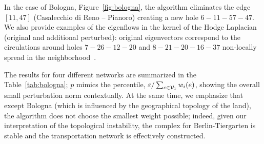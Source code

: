 In the case of Bologna, Figure~\ref{fig:bologna}, the algorithm eliminates the edge $[11, 47]$ (Casalecchio di Reno -- Pianoro) creating a new hole $6 - 11 - 57 - 47$. We also provide examples of the eigenflows in the kernel of the Hodge Laplacian (original and additional perturbed): original eigenvectors correspond to the circulations around holes $7-26-12-20$ and $8-21-20-16-37$ non-locally spread in the neighborhood~\cite{schaub2020random}. 

The results for four different networks are summarized in the Table~\ref{tab:bologna}; $p$ mimics the percentile, $\varepsilon/\sum_{e\in \mathcal{V}_1}{w_i(e)}$, showing the overall small perturbation norm contextually. 
At the same time, we emphasize that except Bologna (which is influenced by the geographical topology of the land), the algorithm does not choose the smallest weight possible; indeed, given our interpretation of the topological instability, the complex for Berlin-Tiergarten is stable and the transportation network is effectively constructed.
































